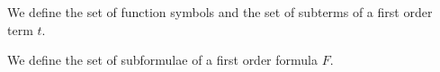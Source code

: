 
\begin{definition}
	We define
	the set of function symbols
	and the set of subterms
of a first order term \( t \).

\end{definition}

\begin{definition}
	We define
	the set of subformulae
of a first order formula \( F \).
\end{definition}




